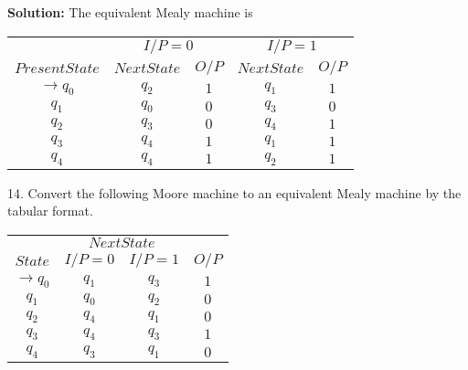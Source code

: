 \documentclass[8pt]{beamer}
\begin{document}
\begin{frame}
\textbf{Solution:} The equivalent Mealy machine is\\

\vspace*{0.2cm}
\begin{center}
\begin{tabular}{ccccc}
 \hline

 \hline

 \hline

 \hline
 &  \multicolumn{2}{c}{$I/P = 0$ } &  \multicolumn{2}{c}{$I/P = 1$}  \\
  \cline{2-3}                         \cline{4-5} 
 $Present State$ &   $Next State$  & $O/P$ &  $Next State$  & $O/P$\\
\hline
$\rightarrow q_0$  &  $q_2$  &  $1$  &  $q_1$  & $1$ \\
$q_1$             &  $q_0$  &  $0$  &  $q_3$  & $0$ \\
$q_2$             &  $q_3$  &  $0$  &  $q_4$  & $1$ \\
$q_3$             &  $q_4$  &  $1$  &  $q_1$  & $1$ \\
$q_4$             &  $q_4$  &  $1$  &  $q_2$  & $1$ \\
 \hline

 \hline

 \hline

 \hline
\end{tabular}
\end{center}

\vspace*{0.3cm}
\end{frame}

\begin{frame}
14. Convert the following Moore machine to an equivalent Mealy machine by the tabular format.\\

\vspace*{0.2cm}
\begin{center}
\begin{tabular}{cccc}
 \hline

 \hline

 \hline

 \hline
 & \multicolumn{2}{c}{$Next State$ }\\
 \cline{2-3} 
 $State$ &  $I/P=0$ & $I/P=1$  &  $O/P$\\
\hline
$\rightarrow q_0$  &    $q_1$   &  $q_3$   &  $1$ \\
$q_1$              &    $q_0$   &  $q_2$   &  $0$ \\
$q_2$              &    $q_4$   &  $q_1$   &  $0$ \\
$q_3$              &    $q_4$   &  $q_3$   &  $1$ \\
$q_4$              &    $q_3$   &  $q_1$   &  $0$ \\
 \hline

 \hline

 \hline

 \hline
\end{tabular}
\end{center}
\end{frame}
\end{document}
